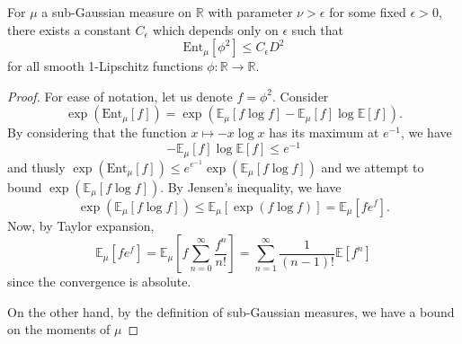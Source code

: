 
\begin{lemma}
  For \(\mu\) a sub-Gaussian measure on \(\mathbb{R}\) with parameter \(\nu > \epsilon\) for some fixed \(\epsilon > 0\), 
  there exists a constant \(C_\epsilon\) which depends only on \(\epsilon\) such that 
  \[\text{Ent}_\mu[\phi^2] \le C_\epsilon D^2\]
  for all smooth 1-Lipschitz functions \(\phi : \mathbb{R} \to \mathbb{R}\).
\end{lemma}
\begin{proof}
  For ease of notation, let us denote \(f = \phi^2\). Consider 
  \[\exp(\text{Ent}_\mu[f]) = \exp(\mathbb{E}_\mu[f\log f] - \mathbb{E}_\mu[f]\log\mathbb{E}[f]).\]
  By considering that the function \(x \mapsto -x\log x\) has its maximum at \(e^{-1}\), we have
  \[- \mathbb{E}_\mu[f]\log\mathbb{E}[f] \le e^{-1}\]
  and thusly \(\exp(\text{Ent}_\mu[f]) \le e^{e^{-1}}\exp(\mathbb{E}_\mu[f\log f])\) and 
  we attempt to bound \(\exp(\mathbb{E}_\mu[f\log f])\). By Jensen's inequality, we have 
  \[\exp(\mathbb{E}_\mu[f\log f]) \le \mathbb{E}_\mu[\exp(f\log f)] = \mathbb{E}_\mu[f e^f].\]
  Now, by Taylor expansion,
  \[\mathbb{E}_\mu[f e^f] = \mathbb{E}_\mu\left[f \sum_{n = 0}^\infty \frac{f^n}{n!}\right]
    = \sum_{n = 1}^\infty \frac{1}{(n - 1)!} \mathbb{E}[f^n]\]
  since the convergence is absolute. 

  On the other hand, by the definition of sub-Gaussian measures, we have a bound on the moments of \(\mu\)
\end{proof}
